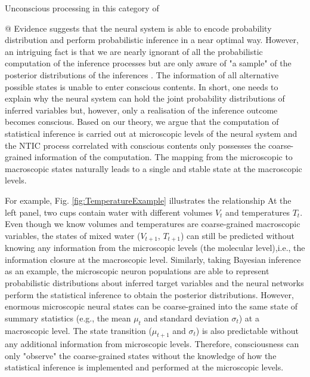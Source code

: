 \documentclass[utf8]{article}
\begin{document}
        
        Unconscious processing in this category of 
        
        @ Evidence suggests that the neural system is able to encode probability distribution and perform probabilistic inference in a near optimal way. However, an intriguing fact is that we are nearly ignorant of all the probabilistic computation of the inference processes but are only aware of "a sample" of the posterior distributions of the inferences \citep{dehaene2017consciousness, vul2009attention, asplund2014attentional, vul2008temporal, moreno2011bayesian}. The information of all alternative possible states is unable to enter conscious contents. In short, one needs to explain why the neural system can hold the joint probability distributions of inferred variables but, however, only a realisation of the inference outcome becomes conscious. Based on our theory, we argue that the computation of statistical inference is carried out at microscopic levels of the neural system and the NTIC process correlated with conscious contents only possesses the coarse-grained information of the computation. The mapping from the microscopic to macroscopic states naturally leads to a single and stable state at the macroscopic levels.
        
        For example, Fig. \ref{fig:TemperatureExample} illustrates the relationship 
        At the left panel, two cups contain water with different volumes $V_t$ and temperatures $T_t$. Even though we know volumes and temperatures are coarse-grained macroscopic variables, the states of mixed water ($V_{t+1}$, $T_{t+1}$) can still be predicted without knowing any information from the microscopic levels (the molecular level),i.e., the information closure at the macroscopic level. Similarly, taking Bayesian inference as an example, the microscopic neuron populations are able to represent probabilistic distributions about inferred target variables and the neural networks perform the statistical inference to obtain the posterior distributions. However, enormous microscopic neural states can be coarse-grained into the same state of summary statistics (e.g., the mean $\mu_{t}$  and standard deviation $\sigma_{t}$) at a macroscopic level. The state transition ($\mu_{t+1}$ and $\sigma_{t}$) is also predictable without any additional information from microscopic levels. Therefore, consciousness can only "observe" the coarse-grained states without the knowledge of how the statistical inference is implemented and performed at the microscopic levels. 
\end{document}
